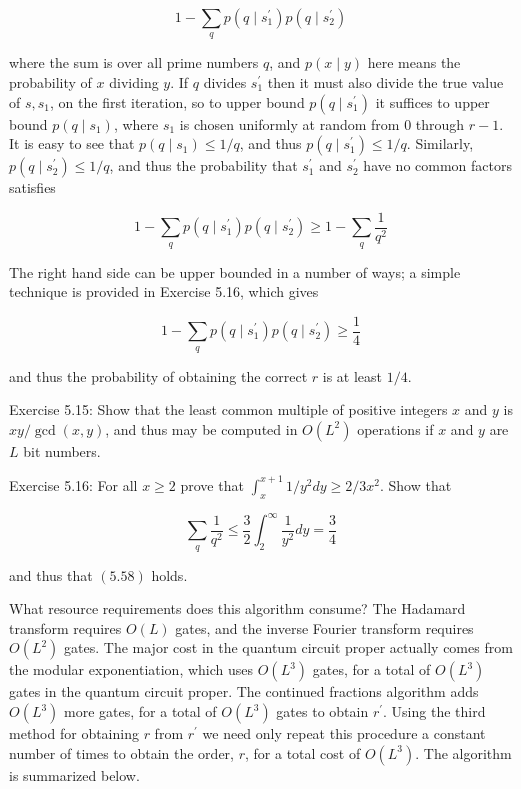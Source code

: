 \begin{equation*}
1-\sum_{q} p\left(q \mid s_{1}^{\prime}\right) p\left(q \mid s_{2}^{\prime}\right) \tag{5.56}
\end{equation*}

where the sum is over all prime numbers $q$, and $p(x \mid y)$ here means the probability of $x$ dividing $y$. If $q$ divides $s_{1}^{\prime}$ then it must also divide the true value of $s, s_{1}$, on the first iteration, so to upper bound $p\left(q \mid s_{1}^{\prime}\right)$ it suffices to upper bound $p\left(q \mid s_{1}\right)$, where $s_{1}$ is chosen uniformly at random from 0 through $r-1$. It is easy to see that $p\left(q \mid s_{1}\right) \leq 1 / q$, and thus $p\left(q \mid s_{1}^{\prime}\right) \leq 1 / q$. Similarly, $p\left(q \mid s_{2}^{\prime}\right) \leq 1 / q$, and thus the probability that $s_{1}^{\prime}$ and $s_{2}^{\prime}$ have no common factors satisfies

\begin{equation*}
1-\sum_{q} p\left(q \mid s_{1}^{\prime}\right) p\left(q \mid s_{2}^{\prime}\right) \geq 1-\sum_{q} \frac{1}{q^{2}} \tag{5.57}
\end{equation*}

The right hand side can be upper bounded in a number of ways; a simple technique is provided in Exercise 5.16, which gives

\begin{equation*}
1-\sum_{q} p\left(q \mid s_{1}^{\prime}\right) p\left(q \mid s_{2}^{\prime}\right) \geq \frac{1}{4} \tag{5.58}
\end{equation*}

and thus the probability of obtaining the correct $r$ is at least $1 / 4$.

Exercise 5.15: Show that the least common multiple of positive integers $x$ and $y$ is $x y / \operatorname{gcd}(x, y)$, and thus may be computed in $O\left(L^{2}\right)$ operations if $x$ and $y$ are $L$ bit numbers.

Exercise 5.16: For all $x \geq 2$ prove that $\int_{x}^{x+1} 1 / y^{2} d y \geq 2 / 3 x^{2}$. Show that

\begin{equation*}
\sum_{q} \frac{1}{q^{2}} \leq \frac{3}{2} \int_{2}^{\infty} \frac{1}{y^{2}} d y=\frac{3}{4} \tag{5.59}
\end{equation*}

and thus that $(5.58)$ holds.

What resource requirements does this algorithm consume? The Hadamard transform requires $O(L)$ gates, and the inverse Fourier transform requires $O\left(L^{2}\right)$ gates. The major cost in the quantum circuit proper actually comes from the modular exponentiation, which uses $O\left(L^{3}\right)$ gates, for a total of $O\left(L^{3}\right)$ gates in the quantum circuit proper. The continued fractions algorithm adds $O\left(L^{3}\right)$ more gates, for a total of $O\left(L^{3}\right)$ gates to obtain $r^{\prime}$. Using the third method for obtaining $r$ from $r^{\prime}$ we need only repeat this procedure a constant number of times to obtain the order, $r$, for a total cost of $O\left(L^{3}\right)$. The algorithm is summarized below.

